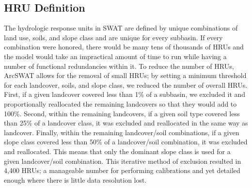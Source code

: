 \subsection{HRU Definition}\label{sec:hru_definition}

The hydrologic response units in SWAT are defined by unique combinations of land use, soils, and slope class and are unique for every subbasin. 
If every combination were honored, there would be many tens of thousands of HRUs and the model would take an impractical amount of time to run while having a number of functional redundancies within it. 
To reduce the number of HRUs, ArcSWAT allows for the removal of small HRUs; by setting a minimum threshold for each landcover, soils, and slope class, we reduced the number of overall HRUs. 
First, if a given landcover covered less than 1\% of a subbasin, we excluded it and proportionally reallocated the remaining landcovers so that they would add to 100\%. 
Second, within the remaining landcovers, if a given soil type covered less than 25\% of a landcover class, it was excluded and reallocated in the same way as landcover. 
Finally, within the remaining landcover/soil combinations, if a given slope class covered less than 50\% of a landcover/soil combination, it was excluded and reallocated. This means that only the dominant slope class is used for a given landcover/soil combination.
This iterative method of exclusion resulted in 4,400 HRUs; a manageable number for performing calibrations and yet detailed enough where there is little data resolution lost. %